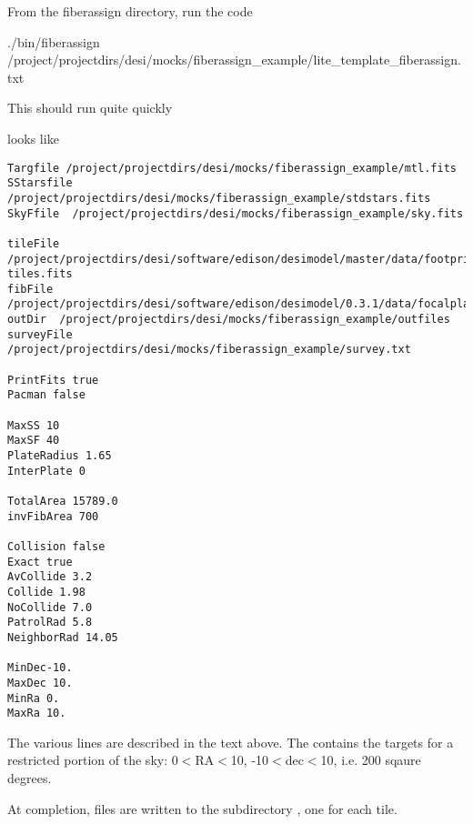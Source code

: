 \documentclass[12pt]{article}
\begin{document}
From the fiberassign directory, run the code

./bin/fiberassign /project/projectdirs/desi/mocks/fiberassign\_example/lite\_template\_fiberassign.txt

This should run quite quickly

 looks like

\begin{verbatim}
Targfile /project/projectdirs/desi/mocks/fiberassign_example/mtl.fits
SStarsfile  /project/projectdirs/desi/mocks/fiberassign_example/stdstars.fits
SkyFfile  /project/projectdirs/desi/mocks/fiberassign_example/sky.fits

tileFile /project/projectdirs/desi/software/edison/desimodel/master/data/footprint/desi-tiles.fits
fibFile /project/projectdirs/desi/software/edison/desimodel/0.3.1/data/focalplane/fiberpos.txt
outDir  /project/projectdirs/desi/mocks/fiberassign_example/outfiles
surveyFile  /project/projectdirs/desi/mocks/fiberassign_example/survey.txt

PrintFits true
Pacman false

MaxSS 10
MaxSF 40
PlateRadius 1.65
InterPlate 0

TotalArea 15789.0
invFibArea 700

Collision false
Exact true
AvCollide 3.2
Collide 1.98
NoCollide 7.0
PatrolRad 5.8
NeighborRad 14.05

MinDec-10.
MaxDec 10.
MinRa 0.
MaxRa 10.
\end{verbatim}

The various lines are described in the text above.  The  contains the targets for a restricted portion of the sky: 0$<$RA$<$10, -10$<$dec$<$10, i.e. 200 sqaure degrees.

At completion, files are written to the subdirectory , one for each tile.  
\end{document}
